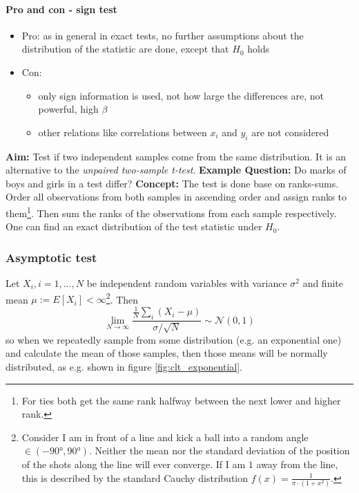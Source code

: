 
\paragraph*{Pro and con - sign test}
\begin{itemize}
    \item \textcolor{green1}{Pro}: as in general in exact tests, no further assumptions about the distribution of the statistic are done, except that $H_0$ holds
    \item \textcolor{red1}{Con}:
    \begin{itemize}
        \item only sign information is used, not how large the differences are, not powerful, high $\beta$
        \item other relations like correlations between $x_i$ and $y_i$ are not considered
    \end{itemize}
\end{itemize}

\textbf{Aim:} Test if two independent samples come from the same distribution. It is an 
alternative to the \textit{unpaired two-sample t-test}.
\textbf{Example Question:} Do marks of boys and girls in a test differ?
\textbf{Concept:} The test is done base on ranks-sums. Order all
observations from both samples in ascending order and assign ranks to them\footnote{For ties both get the same rank halfway between the next lower and higher rank.}. 
Then sum the ranks of the observations from each sample respectively. One can find an exact distribution of the test statistic under $H_0$.

\subsubsection{Asymptotic test}
Let $X_i, i=1,\ldots,N$ be independent random variables with 
variance $\sigma^2$ and finite mean $\mu := E[X_i] < \infty$\footnote{Consider
I am in front of a line and kick a ball into a random angle $\in (-90°, 90°)$.
Neither the mean nor the standard deviation of the position of the shots along the line
will ever converge. If I am $1$ away from the line, this is described by the standard
Cauchy distribution $f(x) = \frac{1}{\pi \cdot (1+x^2)}$.}. Then
\begin{equation}
    \lim _{N \rightarrow \infty} \frac{\frac{1}{N} \sum_i\left(X_i-\mu\right)}{\sigma / \sqrt{N}} \sim \mathcal{N}(0,1)
\end{equation}
so when we repeatedly sample from some distribution (e.g. an exponential one)
and calculate the mean of those samples, then those means will be normally distributed,
as e.g. shown in figure \ref{fig:clt_exponential}.

